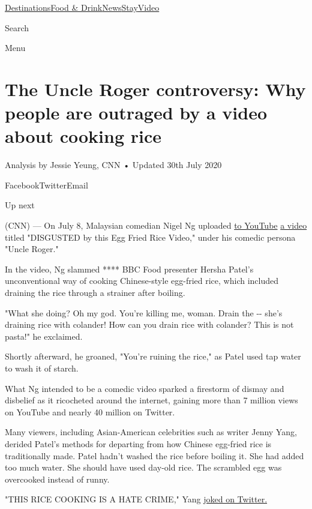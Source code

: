 \href{/}{}\href{/travel}{}

\href{/travel/destinations}{Destinations}\href{/travel/food-and-drink}{Food
\&
Drink}\href{/travel/news}{News}\href{/travel/stay}{Stay}\href{/travel/videos}{Video}

Search

Menu

\hypertarget{the-uncle-roger-controversy-why-people-are-outraged-by-a-video-about-cooking-rice}{%
\section{The Uncle Roger controversy: Why people are outraged by a video
about cooking
rice}\label{the-uncle-roger-controversy-why-people-are-outraged-by-a-video-about-cooking-rice}}

Analysis by Jessie Yeung, CNN • Updated 30th July 2020

FacebookTwitterEmail

Up next

(CNN) --- On July 8, Malaysian comedian Nigel Ng uploaded
\href{https://www.youtube.com/watch?v=53me-ICi_f8}{to YouTube}
\href{https://www.youtube.com/watch?v=53me-ICi_f8}{a video} titled
"DISGUSTED by this Egg Fried Rice Video," under his comedic persona
"Uncle Roger."

In the video, Ng slammed **** BBC Food presenter Hersha Patel's
unconventional way of cooking Chinese-style egg-fried rice, which
included draining the rice through a strainer after boiling.

"What she doing? Oh my god. You're killing me, woman. Drain the -\/-
she's draining rice with colander! How can you drain rice with colander?
This is not pasta!" he exclaimed.

Shortly afterward, he groaned, "You're ruining the rice," as Patel used
tap water to wash it of starch.

What Ng intended to be a comedic video sparked a firestorm of dismay and
disbelief as it ricocheted around the internet, gaining more than 7
million views on YouTube and nearly 40 million on Twitter.

Many viewers, including Asian-American celebrities such as writer Jenny
Yang, derided Patel's methods for departing from how Chinese egg-fried
rice is traditionally made. Patel hadn't washed the rice before boiling
it. She had added too much water. She should have used day-old rice. The
scrambled egg was overcooked instead of runny.

"THIS RICE COOKING IS A HATE CRIME," Yang
\href{https://twitter.com/jennyyangtv/status/1286131803246350336}{joked
on Twitter.}

